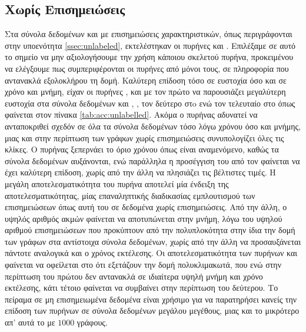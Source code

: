 \subsection{Χωρίς Επισημειώσεις} 
Στα σύνολα δεδομένων  και  με επισημειώσεις χαρακτηριστικών, όπως περιγράφονται στην υποενότητα \ref{ssec:unlabeled}, εκτελέστηκαν οι πυρήνες 
 και .
Επιλέξαμε σε αυτό το σημείο να μην αξιολογήσουμε την χρήση κάποιου σκελετού πυρήνα, προκειμένου να ελέγξουμε πως  συμπεριφέρονται οι πυρήνες από μόνοι τους, σε πληροφορία που αντανακλά εξολοκλήρου τη δομή.
Καλύτερη επίδοση τόσο σε ευστοχία όσο και σε χρόνο και μνήμη, είχαν οι πυρήνες ,  και  με τον πρώτο να παρουσιάζει μεγαλύτερη ευστοχία στα σύνολα δεδομένων  και , , τον δεύτερο στo  ενώ τον τελευταίο στο  όπως φαίνεται στον πίνακα \ref{tab:acc:unlabelled}.
Ακόμα ο πυρήνας  αδυνατεί να ανταποκριθεί σχεδόν σε όλα τα σύνολα δεδομένων τόσο λόγω χρόνου όσο και μνήμης, μιας και στην περίπτωση των γράφων χωρίς επισημειώσεις συνυπολογίζει όλες τις κλίκες.
Ο πυρήνας  ξεπερνάει το όριο χρόνου όπως είναι αναμενόμενο, καθώς τα σύνολα δεδομένων αυξάνονται, ενώ παράλληλα η προσέγγιση του από τον  φαίνεται να έχει καλύτερη επίδοση, χωρίς από την άλλη να πλησιάζει τις βέλτιστες τιμές.
Η μεγάλη αποτελεσματικότητα του πυρήνα  αποτελεί μία ένδειξη της αποτελεσματικότητας, μίας επαναληπτικής διαδικασίας εμπλουτισμού των επισημειώσεων όπως αυτή του  σε δεδομένα χωρίς επισημειώσεις.
Από την άλλη, ο υψηλός αριθμός ακμών φαίνεται να αποτυπώνεται στην μνήμη, λόγω του υψηλού αριθμού επισημειώσεων που προκύπτουν από την πολυπλοκότητα στην ίδια την δομή των γράφων στα αντίστοιχα σύνολα δεδομένων, χωρίς από την άλλη να προσαυξάνεται πάντοτε αναλογικά και ο χρόνος εκτέλεσης.
Οι αποτελεσματικότητα των πυρήνων  και  φαίνεται να οφείλεται στο ότι εξετάζουν την δομή πολυκλιμακωτά, που ενώ στην περίπτωση του πρώτου δεν αντανακλά σε ιδιαίτερα υψηλή μνήμη και χρόνο εκτέλεσης, κάτι τέτοιο φαίνεται να συμβαίνει στην περίπτωση του δεύτερου.
Το πείραμα σε μη επισημειωμένα δεδομένα είναι χρήσιμο για να παρατηρήσει κανείς την επίδοση των πυρήνων σε σύνολα δεδομένων μεγάλου μεγέθους, μιας και το μικρότερο απ' αυτά το  με $1000$ γράφους.
